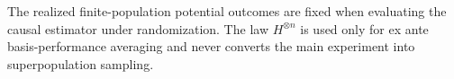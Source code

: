 The realized finite-population potential outcomes are fixed when evaluating the causal estimator under randomization.  The law \(H^{\otimes n}\) is used only for ex ante basis-performance averaging and never converts the main experiment into superpopulation sampling.